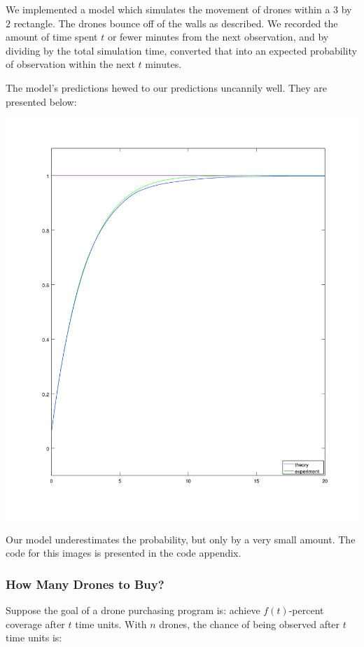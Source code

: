 \documentclass{article}
\begin{document}
We implemented a model which simulates the movement of drones within a $3$ by $2$
	rectangle.
The drones bounce off of the walls as described.
We recorded the amount of time spent $t$ or fewer minutes from the next
	observation, and by dividing by the total simulation time,
	converted that into an expected probability of observation within the
	next $t$ minutes.

The model's predictions hewed to our predictions uncannily well.
They are presented below:

\includegraphics[width=\textwidth]{theory-vs-experiment.png}

Our model underestimates the probability, but only by a very small amount.
The code for this images is presented in the code appendix.

\subsubsection{How Many Drones to Buy?}

Suppose the goal of a drone purchasing program is:
	achieve $f(t)$-percent coverage after $t$ time units.
With $n$ drones, the chance of being observed after $t$ time units is:
\end{document}
